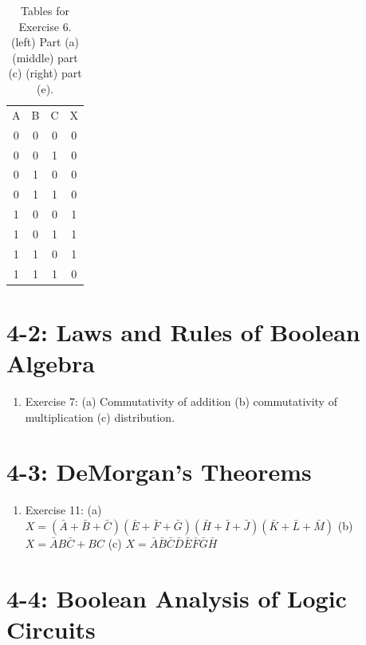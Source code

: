 \documentclass[10pt]{article}
\begin{document}
\begin{enumerate}
\begin{table}[ht]
\begin{tabular}{| c | c | c | c |}
\hline
A & B & C & X \\
0 & 0 & 0 & 0 \\
0 & 0 & 1 & 0 \\
0 & 1 & 0 & 0 \\
0 & 1 & 1 & 0 \\
1 & 0 & 0 & 1 \\
1 & 0 & 1 & 1 \\
1 & 1 & 0 & 1 \\
1 & 1 & 1 & 0 \\
\hline
\end{tabular}
\caption{\label{tab:ex6} Tables for Exercise 6. (left) Part (a) (middle) part (c) (right) part (e).}
\end{table}
\end{enumerate}

\section{4-2: Laws and Rules of Boolean Algebra}

\begin{enumerate}
\item Exercise 7: (a) Commutativity of addition (b) commutativity of multiplication (c) distribution. 
\end{enumerate}

\section{4-3: DeMorgan's Theorems}

\begin{enumerate}
\item Exercise 11: (a) $X = (\bar{A}+\bar{B}+\bar{C})(\bar{E}+\bar{F}+\bar{G})(\bar{H}+\bar{I}+\bar{J})(\bar{K}+\bar{L}+\bar{M})$ (b) $X = \bar{A}B\bar{C} + BC$ (c) $X = \bar{A}\bar{B}\bar{C}\bar{D}\bar{E}\bar{F}\bar{G}\bar{H}$ 
\end{enumerate}

\section{4-4: Boolean Analysis of Logic Circuits}
\end{document}
